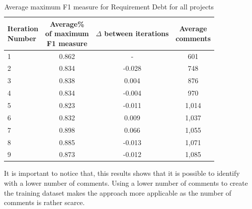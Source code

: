 \begin{table}[!thb]
	\begin{center}
		\caption{Average maximum F1 measure for Requirement Debt for all projects}
		\label{tbl:requirement_iteration_performance}
		\begin{tabular}{l| c c c}
			\toprule
			\thead{Iteration\\Number} & \thead{Average\%\\of maximum\\F1 measure} & \thead{$\Delta$\\between\\iterations} & \thead{Average\\comments} \\
			\midrule
			1  &  0.862 &   -      &  601   \\  
      2  &  0.834 & -0.028   &  748   \\
      3  &  0.838 &  0.004   &  876   \\  
      4  &  0.834 & -0.004   &  970   \\
      5  &  0.823 & -0.011   &  1,014  \\
      6  &  0.832 &  0.009   &  1,037  \\
			7  &  0.898 &  0.066   &  1,055  \\  
      8  &  0.885 & -0.013   &  1,071  \\  
      9  &  0.873 & -0.012   &  1,085  \\  
			\bottomrule
		\end{tabular}
	\end{center}    
\end{table}

It is important to notice that, this results shows that it is possible to identify \SATD with a lower number of comments. Using a lower number of comments to create the training dataset makes the approach more applicable as the number of \SATD comments is rather scarce.    

